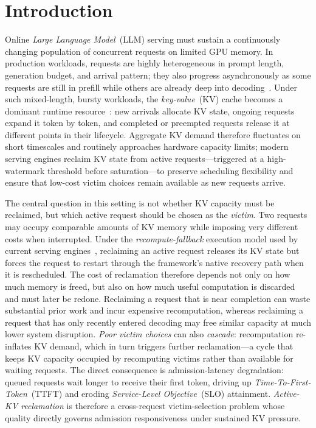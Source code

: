 \documentclass[conference]{IEEEtran}
\begin{document}
\section{Introduction}\label{sec:intro}
Online \emph{Large Language Model}~(LLM) serving must sustain a continuously changing
population of concurrent requests on limited GPU memory.  In production
workloads, requests are highly heterogeneous in prompt length, generation
budget, and arrival pattern; they also progress asynchronously as some requests
are still in prefill while others are already deep into
decoding~\cite{Kwon2023, Yu2022, Zheng2024lmsys}.  Under such mixed-length,
bursty workloads, the \emph{key-value}~(KV) cache becomes a dominant runtime
resource~\cite{Vaswani2017, Pope2022}: new arrivals
allocate KV state, ongoing requests expand it token by token, and completed or
preempted requests release it at different points in their lifecycle.  Aggregate
KV demand therefore fluctuates on short timescales and routinely approaches
hardware capacity limits; modern serving engines reclaim KV state from active
requests---triggered at a high-watermark threshold before saturation---to
preserve scheduling flexibility and ensure that low-cost victim choices remain
available as new requests arrive.

The central question in this setting is not whether KV capacity must be
reclaimed, but which active request should be chosen as the \emph{victim}.
Two requests may occupy comparable amounts of KV memory while imposing very
different costs when interrupted.  Under the \emph{recompute-fallback}
execution model used by current serving engines~\cite{Kwon2023}, reclaiming an
active request releases its KV state but forces the request to restart through
the framework's native recovery path when it is rescheduled.  The cost of reclamation therefore
depends not only on how much memory is freed, but also on how much useful
computation is discarded and must later be redone.  Reclaiming a request that is
near completion can waste substantial prior work and incur expensive
recomputation, whereas reclaiming a request that has only recently entered
decoding may free similar capacity at much lower system disruption.  \emph{Poor victim
choices} can also \emph{cascade}: recomputation re-inflates KV demand, which in turn
triggers further reclamation---a cycle that keeps KV capacity occupied by
recomputing victims rather than available for waiting requests.  The direct
consequence is admission-latency degradation: queued requests wait longer to
receive their first token, driving up \emph{Time-To-First-Token}~(TTFT) and eroding
\emph{Service-Level Objective}~(SLO) attainment.  \emph{Active-KV reclamation} is therefore a
cross-request victim-selection problem whose quality directly governs admission
responsiveness under sustained KV pressure.
\end{document}
